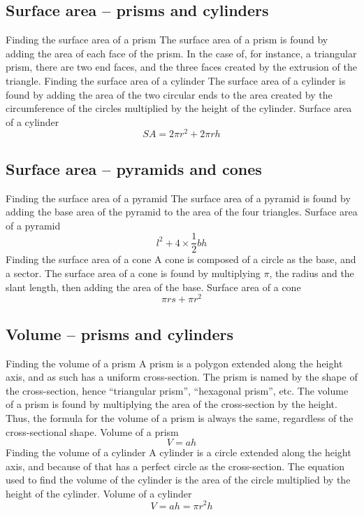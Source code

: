 \begin{outline}
\0
\subsection{Surface area -- prisms and cylinders}
	\1 Finding the surface area of a prism
		\2 The surface area of a prism is found by adding the area of each face of the prism. In the case of, for instance, a triangular prism, there are two end faces, and the three faces created by the extrusion of the triangle.
	\1 Finding the surface area of a cylinder
		\2 The surface area of a cylinder is found by adding the area of the two circular ends to the area created by the circumference of the circles multiplied by the height of the cylinder.
			\3 Surface area of a cylinder
				\[SA = 2\pi r^2 + 2\pi rh\]

\0
\subsection{Surface area -- pyramids and cones}
	\1 Finding the surface area of a pyramid
		\2 The surface area of a pyramid is found by adding the base area of the pyramid to the area of the four triangles.
			\3 Surface area of a pyramid
				\[l^2 + 4 \times \frac{1}{2}bh\]
	\1 Finding the surface area of a cone
		\2 A cone is composed of a circle as the base, and a sector. The surface area of a cone is found by multiplying $\pi$, the radius and the slant length, then adding the area of the base.
			\3 Surface area of a cone
				\[\pi rs + \pi r^2\]

\0
\subsection{Volume -- prisms and cylinders}
	\1 Finding the volume of a prism
		\2 A prism is a polygon extended along the height axis, and as such has a uniform cross-section. The prism is named by the shape of the cross-section, hence ``triangular prism'', ``hexagonal prism'', etc. The volume of a prism is found by multiplying the area of the cross-section by the height. Thus, the formula for the volume of a prism is always the same, regardless of the cross-sectional shape.
			\3 Volume of a prism
				\[V = ah\]
	\1 Finding the volume of a cylinder
		\2 A cylinder is a circle extended along the height axis, and because of that has a perfect circle as the cross-section. The equation used to find the volume of the cylinder is the area of the circle multiplied by the height of the cylinder.
			\3 Volume of a cylinder
				\[V = ah = \pi r^2 h\]


\end{outline}
